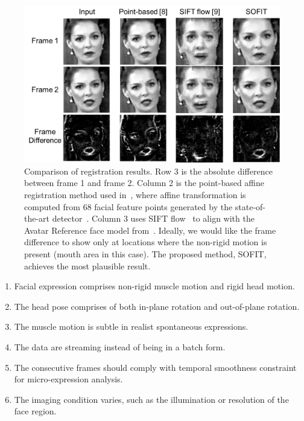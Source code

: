 \documentclass[10pt,journal]{IEEEtran}
\begin{document}
\begin{figure}[!t]
	\centering
		\includegraphics[width=\columnwidth]{fig/regComp.png}
	\caption{Comparison of registration results. Row 3 is the absolute difference between frame 1 and frame 2. Column 2 is the point-based affine registration method used in~\cite{Littlewort_CERT_FG2011,Valstar_SMCB12}, where affine transformation is computed from 68 facial feature points generated by the state-of-the-art detector~\cite{Zhu_CVPR12}. Column 3 uses SIFT flow~\cite{Liu_PAMI11} to align with the Avatar Reference face model from~\cite{Yang_SMCB12}. Ideally, we would like the frame difference to show only at locations where the non-rigid motion is present (mouth area in this case). The proposed method, SOFIT, achieves the most plausible result.}
	\label{fig:regComp}
\end{figure}

\begin{enumerate}
\item Facial expression comprises non-rigid muscle motion and rigid head motion.
\item The head pose comprises of both in-plane rotation and out-of-plane rotation.
\item The muscle motion is subtle in realist spontaneous expressions.
\item The data are streaming instead of being in a batch form.
\item The consecutive frames should comply with temporal smoothness constraint for micro-expression analysis.
\item The imaging condition varies, such as the illumination or resolution of the face region.
\end{enumerate}
\end{document}
